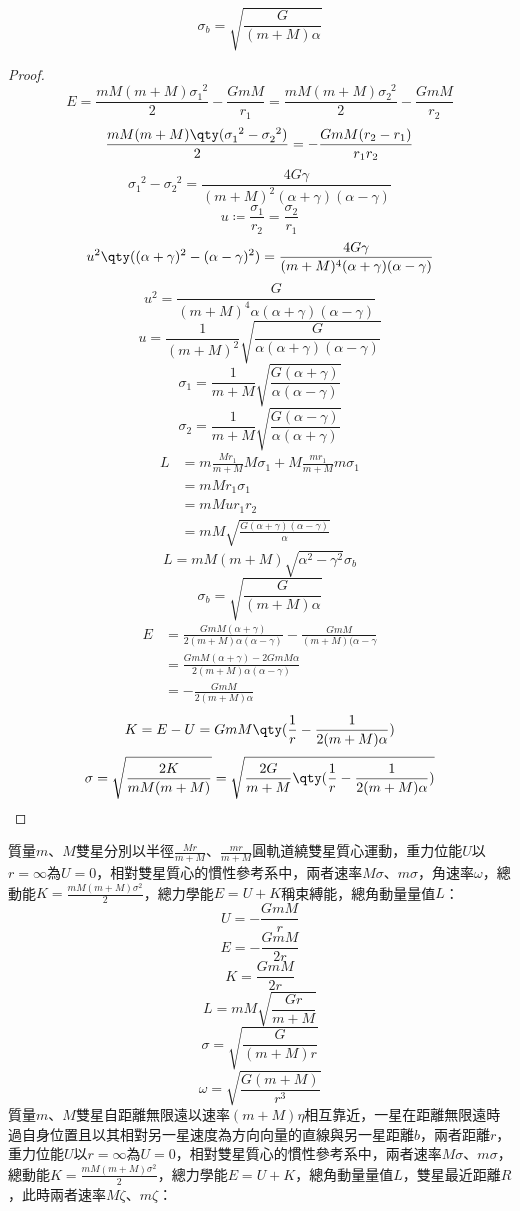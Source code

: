 \documentclass[a4paper,12pt]{article}
\begin{document}
\[\sigma_b=\sqrt{\frac{G}{(m+M)\alpha}}\]
\begin{proof}
\[E=\frac{mM(m+M)\sigma_1^{\phantom{1}2}}{2}-\frac{GmM}{r_1}=\frac{mM(m+M)\sigma_2^{\phantom{2}2}}{2}-\frac{GmM}{r_2}\]
\[\frac{mM(m+M)\qty(\sigma_1^{\phantom{1}2}-\sigma_2^{\phantom{2}2})}{2}=-\frac{GmM(r_2-r_1)}{r_1r_2}\]
\[\sigma_1^{\phantom{1}2}-\sigma_2^{\phantom{2}2}=\frac{4G\gamma}{(m+M)^2(\alpha+\gamma)(\alpha-\gamma)}\]
\[u\coloneq\frac{\sigma_1}{r_2}=\frac{\sigma_2}{r_1}\]
\[u^2\qty((\alpha+\gamma)^2-(\alpha-\gamma)^2)=\frac{4G\gamma}{(m+M)^4(\alpha+\gamma)(\alpha-\gamma)}\]
\[u^2=\frac{G}{(m+M)^4\alpha(\alpha+\gamma)(\alpha-\gamma)}\]
\[u=\frac{1}{(m+M)^2}\sqrt{\frac{G}{\alpha(\alpha+\gamma)(\alpha-\gamma)}}\]
\[\sigma_1=\frac{1}{m+M}\sqrt{\frac{G(\alpha+\gamma)}{\alpha(\alpha-\gamma)}}\]
\[\sigma_2=\frac{1}{m+M}\sqrt{\frac{G(\alpha-\gamma)}{\alpha(\alpha+\gamma)}}\]
\[\begin{aligned}
L&=m\frac{Mr_1}{m+M}M\sigma_1+M\frac{mr_1}{m+M}m\sigma_1\\
&=mMr_1\sigma_1\\
&=mMur_1r_2\\
&=mM\sqrt{\frac{G(\alpha+\gamma)(\alpha-\gamma)}{\alpha}}
\end{aligned}\]
\[L=mM(m+M)\sqrt{\alpha^2-\gamma^2}\sigma_b\]
\[\sigma_b=\sqrt{\frac{G}{(m+M)\alpha}}\]
\[\begin{aligned}
E&=\frac{GmM(\alpha+\gamma)}{2(m+M)\alpha(\alpha-\gamma)}-\frac{GmM}{(m+M)(\alpha-\gamma}\\
&=\frac{GmM(\alpha+\gamma)-2GmM\alpha}{2(m+M)\alpha(\alpha-\gamma)}\\
&=-\frac{GmM}{2(m+M)\alpha}
\end{aligned}\]
\[K=E-U=GmM\qty(\frac{1}{r}-\frac{1}{2(m+M)\alpha})\]
\[\sigma=\sqrt{\frac{2K}{mM(m+M)}}=\sqrt{\frac{2G}{m+M}\qty(\frac{1}{r}-\frac{1}{2(m+M)\alpha})}\]
\end{proof}
質量$m$、$M$雙星分別以半徑$\frac{Mr}{m+M}$、$\frac{mr}{m+M}$圓軌道繞雙星質心運動，重力位能$U$以$r=\infty$為$U=0$，相對雙星質心的慣性參考系中，兩者速率$M\sigma$、$m\sigma$，角速率$\omega$，總動能$K=\frac{mM(m+M)\sigma^2}{2}$，總力學能$E=U+K$稱束縛能，總角動量量值$L$：
\[U=-\frac{GmM}{r}\]
\[E=-\frac{GmM}{2r}\]
\[K=\frac{GmM}{2r}\]
\[L=mM\sqrt{\frac{Gr}{m+M}}\]
\[\sigma=\sqrt{\frac{G}{(m+M)r}}\]
\[\omega=\sqrt{\frac{G(m+M)}{r^3}}\]
質量$m$、$M$雙星自距離無限遠以速率$(m+M)\eta$相互靠近，一星在距離無限遠時過自身位置且以其相對另一星速度為方向向量的直線與另一星距離$b$，兩者距離$r$，重力位能$U$以$r=\infty$為$U=0$，相對雙星質心的慣性參考系中，兩者速率$M\sigma$、$m\sigma$，總動能$K=\frac{mM(m+M)\sigma^2}{2}$，總力學能$E=U+K$，總角動量量值$L$，雙星最近距離$R$，此時兩者速率$M\zeta$、$m\zeta$：
\end{document}
